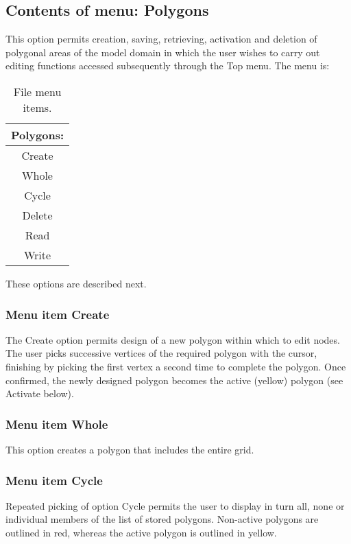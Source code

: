 \documentclass{article}
\begin{document}
\subsection{Contents of menu: Polygons}
This option permits creation, saving, retrieving, activation and deletion of polygonal areas of the model domain in which the user wishes to carry out editing functions accessed subsequently through the Top menu. The menu is:

\begin{table}[htb!]
 \caption{File menu items.}
  \begin{center}
   \begin{tabular}{|c|}
    \hline
Polygons:\\     \hline
Create \\ Whole \\ Cycle \\ Delete \\ Read \\ Write \\
    \hline
   \end{tabular}
   \label{tab:POLYGONS}
  \end{center}
\end{table}


These options are described next.

\subsubsection[Menu item Create]{Menu item Create}
The Create option permits design of a new polygon within which to edit nodes. The user picks successive vertices of the required polygon with the cursor, finishing by picking the first vertex a second time to complete the polygon. Once confirmed, the newly designed polygon becomes the active (yellow) polygon (see Activate below).

\subsubsection[Menu item Whole]{Menu item Whole}
This option creates a polygon that includes the entire grid.

\subsubsection[Menu item Cycle]{Menu item Cycle}
Repeated picking of option Cycle permits the user to display in turn all, none or individual members of the list of stored polygons. Non-active polygons are outlined in red, whereas the active polygon is outlined in yellow.
\end{document}
